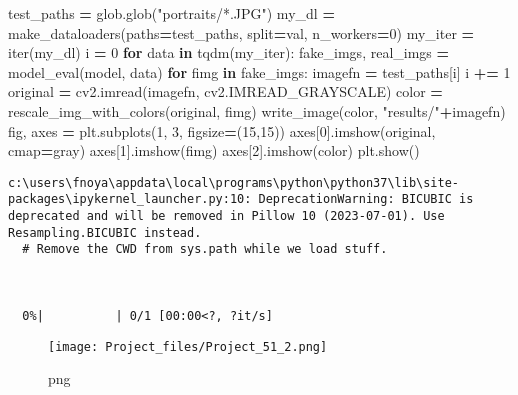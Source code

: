 \documentclass[
]{article}
\newenvironment{Shaded}{\begin{snugshade}}{\end{snugshade}}
\newcommand{\BuiltInTok}[1]{#1}
\newcommand{\ControlFlowTok}[1]{\textcolor[rgb]{0.13,0.29,0.53}{\textbf{#1}}}
\newcommand{\DecValTok}[1]{\textcolor[rgb]{0.00,0.00,0.81}{#1}}
\newcommand{\KeywordTok}[1]{\textcolor[rgb]{0.13,0.29,0.53}{\textbf{#1}}}
\newcommand{\NormalTok}[1]{#1}
\newcommand{\OperatorTok}[1]{\textcolor[rgb]{0.81,0.36,0.00}{\textbf{#1}}}
\newcommand{\StringTok}[1]{\textcolor[rgb]{0.31,0.60,0.02}{#1}}
\begin{document}
\begin{Shaded}
\begin{Highlighting}[]
\NormalTok{test\_paths }\OperatorTok{=}\NormalTok{ glob.glob(}\StringTok{"portraits/*.JPG"}\NormalTok{)}
\NormalTok{my\_dl }\OperatorTok{=}\NormalTok{ make\_dataloaders(paths}\OperatorTok{=}\NormalTok{test\_paths, split}\OperatorTok{=}\StringTok{\textquotesingle{}val\textquotesingle{}}\NormalTok{,  n\_workers}\OperatorTok{=}\DecValTok{0}\NormalTok{) }
\NormalTok{my\_iter }\OperatorTok{=} \BuiltInTok{iter}\NormalTok{(my\_dl)}
\NormalTok{i }\OperatorTok{=} \DecValTok{0}
\ControlFlowTok{for}\NormalTok{ data }\KeywordTok{in}\NormalTok{ tqdm(my\_iter):}
\NormalTok{    fake\_imgs, real\_imgs }\OperatorTok{=}\NormalTok{ model\_eval(model, data)}
    \ControlFlowTok{for}\NormalTok{ fimg }\KeywordTok{in}\NormalTok{ fake\_imgs:}
\NormalTok{        imagefn }\OperatorTok{=}\NormalTok{ test\_paths[i]}
\NormalTok{        i }\OperatorTok{+=} \DecValTok{1}
\NormalTok{        original }\OperatorTok{=}\NormalTok{ cv2.imread(imagefn, cv2.IMREAD\_GRAYSCALE)}
\NormalTok{        color }\OperatorTok{=}\NormalTok{ rescale\_img\_with\_colors(original, fimg)}
\NormalTok{        write\_image(color, }\StringTok{"results/"}\OperatorTok{+}\NormalTok{imagefn)}
\NormalTok{        fig, axes }\OperatorTok{=}\NormalTok{ plt.subplots(}\DecValTok{1}\NormalTok{, }\DecValTok{3}\NormalTok{, figsize}\OperatorTok{=}\NormalTok{(}\DecValTok{15}\NormalTok{,}\DecValTok{15}\NormalTok{))}
\NormalTok{        axes[}\DecValTok{0}\NormalTok{].imshow(original, cmap}\OperatorTok{=}\StringTok{\textquotesingle{}gray\textquotesingle{}}\NormalTok{)}
\NormalTok{        axes[}\DecValTok{1}\NormalTok{].imshow(fimg)}
\NormalTok{        axes[}\DecValTok{2}\NormalTok{].imshow(color)}
\NormalTok{        plt.show()}
\end{Highlighting}
\end{Shaded}

\begin{verbatim}
c:\users\fnoya\appdata\local\programs\python\python37\lib\site-packages\ipykernel_launcher.py:10: DeprecationWarning: BICUBIC is deprecated and will be removed in Pillow 10 (2023-07-01). Use Resampling.BICUBIC instead.
  # Remove the CWD from sys.path while we load stuff.



  0%|          | 0/1 [00:00<?, ?it/s]
\end{verbatim}

\begin{figure}
\centering
\texttt{[image: Project\_files/Project\_51\_2.png]}
\caption{png}
\end{figure}
\end{document}

